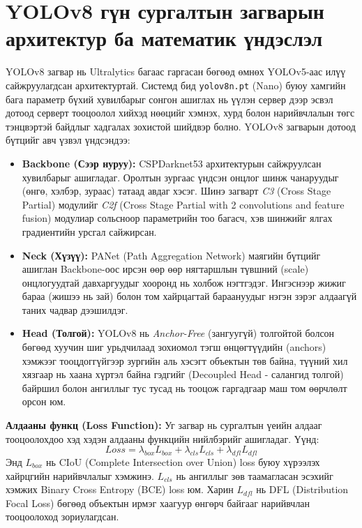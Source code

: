 \section{YOLOv8 гүн сургалтын загварын архитектур ба математик үндэслэл}
YOLOv8 загвар нь Ultralytics багаас гаргасан бөгөөд өмнөх YOLOv5-аас илүү сайжруулагдсан архитектуртай. Системд бид \texttt{yolov8n.pt} (Nano) буюу хамгийн бага параметр бүхий хувилбарыг сонгон ашиглах нь үүлэн сервер дээр эсвэл дотоод серверт тооцоолол хийхэд нөөцийг хэмнэх, хурд болон нарийвчлалын төгс тэнцвэртэй байдлыг хадгалах зохистой шийдвэр болно. YOLOv8 загварын дотоод бүтцийг авч үзвэл үндсэндээ:
\begin{itemize}
    \item \textbf{Backbone (Сээр нуруу):} CSPDarknet53 архитектурын сайжруулсан хувилбарыг ашигладаг. Оролтын зургаас үндсэн онцлог шинж чанаруудыг (өнгө, хэлбэр, зураас) татаад авдаг хэсэг. Шинэ загварт \textit{C3} (Cross Stage Partial) модулийг \textit{C2f} (Cross Stage Partial with 2 convolutions and feature fusion) модулиар сольсноор параметрийн тоо багасч, хэв шинжийг ялгах градиентийн урсгал сайжирсан.
    \item \textbf{Neck (Хүзүү):} PANet (Path Aggregation Network) маягийн бүтцийг ашиглан Backbone-оос ирсэн өөр өөр нягтаршлын түвшний (scale) онцлогуудтай давхаргуудыг хооронд нь холбож нэгтгэдэг. Ингэснээр жижиг бараа (жишээ нь зай) болон том хайрцагтай бараануудыг нэгэн зэрэг алдаагүй таних чадвар дээшилдэг.
    \item \textbf{Head (Толгой):} YOLOv8 нь \textit{Anchor-Free} (зангуугүй) толгойтой болсон бөгөөд хуучин шиг урьдчилаад зохиомол тэгш өнцөгтүүдийн (anchors) хэмжээг тооцдоггүйгээр зургийн аль хэсэгт объектын төв байна, түүний хил хязгаар нь хаана хүртэл байна гэдгийг (Decoupled Head - салангид толгой) байршил болон ангиллыг тус тусад нь тооцож гаргадгаар маш том өөрчлөлт орсон юм.
\end{itemize}

\textbf{Алдааны функц (Loss Function):} Уг загвар нь сургалтын үеийн алдааг тооцоолохдоо хэд хэдэн алдааны функцийн нийлбэрийг ашигладаг. Үүнд:
\begin{equation}
    Loss = \lambda_{box} L_{box} + \lambda_{cls} L_{cls} + \lambda_{dfl} L_{dfl}
\end{equation}
Энд $L_{box}$ нь CIoU (Complete Intersection over Union) loss буюу хүрээлэх хайрцгийн нарийвчлалыг хэмжинэ. $L_{cls}$ нь ангиллыг зөв таамагласан эсэхийг хэмжих Binary Cross Entropy (BCE) loss юм. Харин $L_{dfl}$ нь DFL (Distribution Focal Loss) бөгөөд объектын ирмэг хаагуур өнгөрч байгааг нарийвчлан тооцоолоход зориулагдсан.

